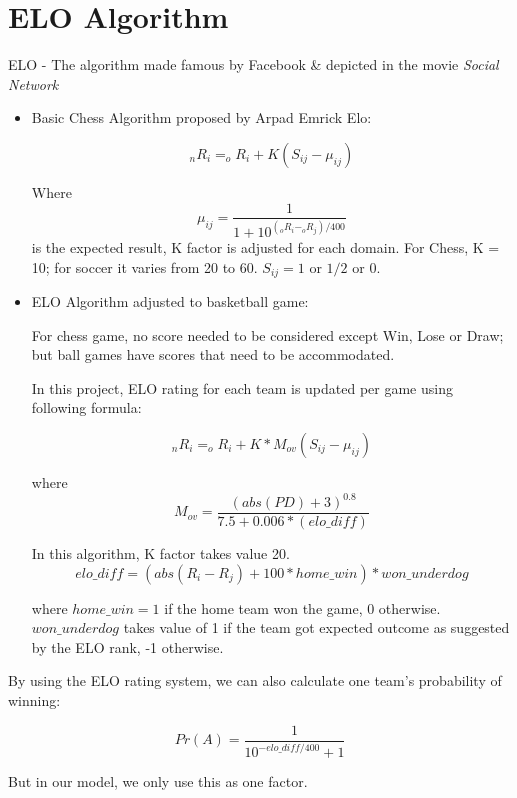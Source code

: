 \section{ELO Algorithm}


ELO - The algorithm made famous by Facebook \& depicted in the movie \textit{Social
Network}
\begin{itemize}
  \item Basic Chess Algorithm proposed by Arpad Emrick Elo:

\[ _{n}R_{i} = _{o}R_{i} + K(S_{ij} - \mu_{ij}) \]

Where 
\[ \mu_{ij} = \frac{1}{1+10^{(_{o}R_{i} - _{o}R_{j})/400}} \] is the expected
result, K factor is adjusted for each domain. For Chess, K = 10; for soccer it 
varies from 20 to 60. $S_{ij} = 1$ or $1/2$ or $0$.


  \item  ELO Algorithm adjusted to basketball game:


For chess game, no score needed to be considered except Win, Lose or Draw;
but ball games have scores that need to be accommodated.


In this project, ELO rating for each team is updated per game using following
formula:

\[ _{n}R_{i} = _{o}R_{i} + K*M_{ov}(S_{ij} - \mu_{ij}) \]


where 
\[ M_{ov} = \frac{(abs(PD) + 3)^{0.8}}{7.5 + 0.006*(elo\_diff)} \]


In this algorithm, K factor takes value 20. 
\[ elo\_diff = (abs(R_{i} - R_{j})+100*home\_win)*won\_underdog \]


where $home\_win = 1$ if the home team won the game, 0 otherwise. $won\_underdog$ 
takes value of 1 if the team got expected outcome as suggested by the ELO rank, -1 otherwise.

\end{itemize}

 
By using the ELO rating system, we can also calculate one team's probability
of winning:

\[ Pr(A) = \frac{1}{10 ^{-elo\_diff/400}+1} \]

But in our model, we only use this as one factor.


